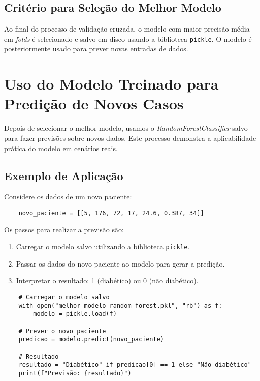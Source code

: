 \documentclass[a4paper,12pt]{article}
\begin{document}
\subsection{Critério para Seleção do Melhor Modelo}
Ao final do processo de validação cruzada, o modelo com maior precisão média em \textit{folds} é selecionado e salvo em disco usando a biblioteca \texttt{pickle}. O modelo é posteriormente usado para prever novas entradas de dados.

\section{Uso do Modelo Treinado para Predição de Novos Casos}

Depois de selecionar o melhor modelo, usamos o \textit{RandomForestClassifier} salvo para fazer previsões sobre novos dados. Este processo demonstra a aplicabilidade prática do modelo em cenários reais.

\subsection{Exemplo de Aplicação}

Considere os dados de um novo paciente:

\begin{verbatim}
    novo_paciente = [[5, 176, 72, 17, 24.6, 0.387, 34]]
\end{verbatim}

Os passos para realizar a previsão são:
\begin{enumerate}
    \item Carregar o modelo salvo utilizando a biblioteca \texttt{pickle}.
    \item Passar os dados do novo paciente ao modelo para gerar a predição.
    \item Interpretar o resultado: 1 (diabético) ou 0 (não diabético).
\end{enumerate}

\begin{verbatim}
    # Carregar o modelo salvo
    with open("melhor_modelo_random_forest.pkl", "rb") as f:
        modelo = pickle.load(f)

    # Prever o novo paciente
    predicao = modelo.predict(novo_paciente)

    # Resultado
    resultado = "Diabético" if predicao[0] == 1 else "Não diabético"
    print(f"Previsão: {resultado}")
\end{verbatim}
\end{document}
